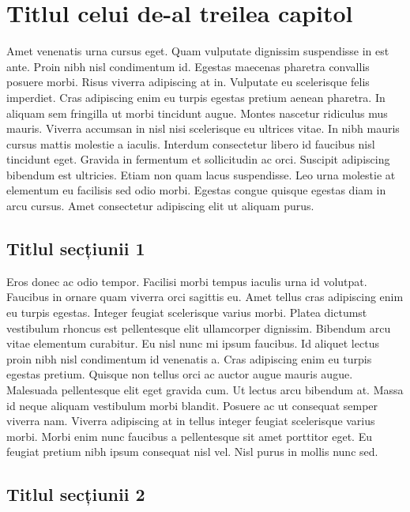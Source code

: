 \chapter{Titlul celui de-al treilea capitol}

Amet venenatis urna cursus eget. Quam vulputate dignissim suspendisse in est ante. Proin nibh nisl condimentum id. Egestas maecenas 
pharetra convallis posuere morbi. Risus viverra adipiscing at in. Vulputate eu scelerisque felis imperdiet. Cras adipiscing enim eu 
turpis egestas pretium aenean pharetra. In aliquam sem fringilla ut morbi tincidunt augue. Montes nascetur ridiculus mus mauris. Viverra 
accumsan in nisl nisi scelerisque eu ultrices vitae. In nibh mauris cursus mattis molestie a iaculis. Interdum consectetur libero id 
faucibus nisl tincidunt eget. Gravida in fermentum et sollicitudin ac orci. Suscipit adipiscing bibendum est ultricies. Etiam non quam 
lacus suspendisse. Leo urna molestie at elementum eu facilisis sed odio morbi. Egestas congue quisque egestas diam in arcu cursus. Amet 
consectetur adipiscing elit ut aliquam purus.

\section{Titlul secțiunii 1}

Eros donec ac odio tempor. Facilisi morbi tempus iaculis urna id volutpat. Faucibus in ornare quam viverra orci sagittis eu. Amet 
tellus cras adipiscing enim eu turpis egestas. Integer feugiat scelerisque varius morbi. Platea dictumst vestibulum rhoncus est 
pellentesque elit ullamcorper dignissim. Bibendum arcu vitae elementum curabitur. Eu nisl nunc mi ipsum faucibus. Id aliquet lectus 
proin nibh nisl condimentum id venenatis a. Cras adipiscing enim eu turpis egestas pretium. Quisque non tellus orci ac auctor augue 
mauris augue. Malesuada pellentesque elit eget gravida cum. Ut lectus arcu bibendum at. Massa id neque aliquam vestibulum morbi 
blandit. Posuere ac ut consequat semper viverra nam. Viverra adipiscing at in tellus integer feugiat scelerisque varius morbi. 
Morbi enim nunc faucibus a pellentesque sit amet porttitor eget. Eu feugiat pretium nibh ipsum consequat nisl vel. Nisl purus in 
mollis nunc sed.

\section{Titlul secțiunii 2}

